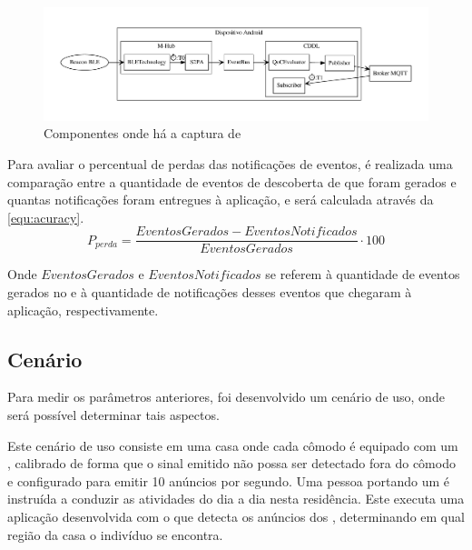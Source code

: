 \begin{figure}[htb]
	
	\begin{center}

		\caption{\label{img:performance-annotation}Componentes onde há a captura de \timestamps}
		\includegraphics[width=0.95\linewidth]{img/performance-annotation}
		\fonte{\autoriapropria}

	\end{center}
	
\end{figure}

Para avaliar o percentual de perdas das notificações de eventos, é realizada uma comparação entre a quantidade de eventos de descoberta de \smartobjs que foram gerados e quantas notificações foram entregues à aplicação, e será calculada através da \autoref{equ:acuracy}.
\begin{equation}
	\label{equ:acuracy}
	P_{perda} = \frac{EventosGerados - EventosNotificados}{EventosGerados} \cdot 100
\end{equation}

Onde $EventosGerados$ e $EventosNotificados$ se referem à quantidade de eventos gerados no \stwopa e à quantidade de notificações desses eventos que chegaram à aplicação, respectivamente.


\subsection{Cenário}\label{sub:cenario}
Para medir os parâmetros anteriores, foi desenvolvido um cenário de uso, onde será possível determinar tais aspectos.

Este cenário de uso consiste em uma casa onde cada cômodo é equipado com um \beacon \ble, calibrado de forma que o sinal emitido não possa ser detectado fora do cômodo e configurado para emitir 10 anúncios por segundo.
Uma pessoa portando um \smartphone é instruída a conduzir as atividades do dia a dia nesta residência.
Este \smartphone executa uma aplicação desenvolvida com o \middleware \mhubcddl que detecta os anúncios dos \beacons, determinando em qual região da casa o indivíduo se encontra.

